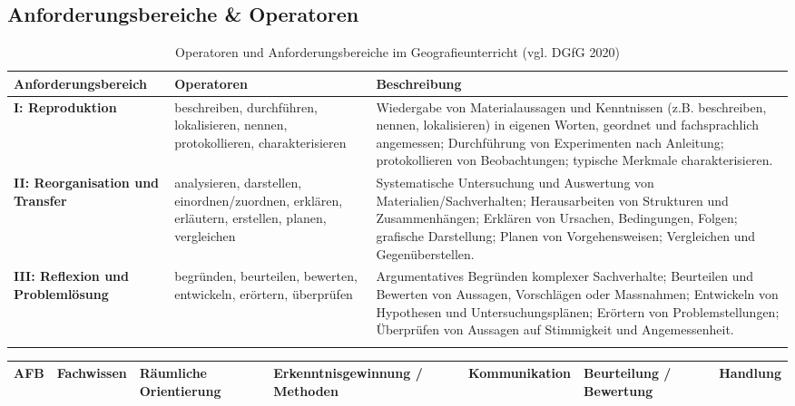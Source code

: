 \begin{landscape}
  \subsection{Anforderungsbereiche \& Operatoren}
  \begin{longtable}{>{\bfseries}p{3.2cm} | p{4.5cm} | p{7cm}}
    \toprule
    \textbf{Anforderungsbereich}                                                                     & \textbf{Operatoren} & \textbf{Beschreibung}                                                                                                                          \\
    \midrule
    \textbf{I: Reproduktion}                                                                         &
    beschreiben, durchführen, lokalisieren, nennen, protokollieren, charakterisieren                 &
    Wiedergabe von Materialaussagen und Kenntnissen (z.B. beschreiben, nennen, lokalisieren) in eigenen Worten, geordnet und fachsprachlich angemessen; Durchführung von Experimenten nach Anleitung; protokollieren von Beobachtungen; typische Merkmale charakterisieren. \\
    \midrule
    \textbf{II: Reorganisation und Transfer}                                                         &
    analysieren, darstellen, einordnen/zuordnen, erklären, erläutern, erstellen, planen, vergleichen &
    Systematische Untersuchung und Auswertung von Materialien/Sachverhalten; Herausarbeiten von Strukturen und Zusammenhängen; Erklären von Ursachen, Bedingungen, Folgen; grafische Darstellung; Planen von Vorgehensweisen; Vergleichen und Gegenüberstellen.             \\
    \midrule
    \textbf{III: Reflexion und Problemlösung}                                                        &
    begründen, beurteilen, bewerten, entwickeln, erörtern, überprüfen                                &
    Argumentatives Begründen komplexer Sachverhalte; Beurteilen und Bewerten von Aussagen, Vorschlägen oder Massnahmen; Entwickeln von Hypothesen und Untersuchungsplänen; Erörtern von Problemstellungen; Überprüfen von Aussagen auf Stimmigkeit und Angemessenheit.       \\
    \bottomrule
    \caption{Operatoren und Anforderungsbereiche im Geografieunterricht (vgl. DGfG 2020)}
  \end{longtable}

  \setlength{\tabcolsep}{5pt}
  \begin{table}[H]
    \centering
    \begin{tabular}{>{\bfseries}p{2.5cm} | p{3cm} p{3cm} p{3cm} p{3cm} p{3cm} p{3cm}}
      \toprule
      \textbf{AFB}                                                                                         & \textbf{Fachwissen} & \textbf{Räumliche Orientierung} & \textbf{Erkenntnisgewinnung / Methoden} & \textbf{Kommunikation} & \textbf{Beurteilung / Bewertung} & \textbf{Handlung} \\
      \midrule


\end{tabular}
\end{table}
\end{landscape}
